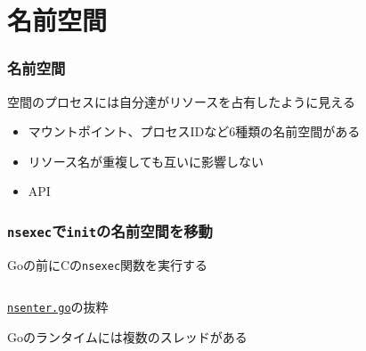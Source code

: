 \documentclass[unicode, 14pt, aspectratio=169]{beamer}
\begin{document}
\section{名前空間}
\begin{frame}[t]
  \frametitle{名前空間\supercite{namespaces}}
  空間のプロセスには自分達がリソースを占有したように見える
  \begin{itemize}[leftmargin=0.8cm,label=$\circ$]
    \item マウントポイント、プロセスIDなど6種類の名前空間がある
    \item リソース名が重複しても互いに影響しない
    \item API
    \end{itemize}
\end{frame}
\begin{frame}[t]
  \frametitle{\texttt{nsexec}で\texttt{init}の名前空間を移動}
  Goの前にCの\texttt{nsexec}関数を実行する
  \begin{center}
    \inputminted{go}{code/nsenter.go}
    \href{https://github.com/opencontainers/runc/blob/7cb363254b69e10320360b63fb73e0ffb5da7bf2/libcontainer/nsenter/nsenter.go\#L12}{\texttt{nsenter.go}}の抜粋
  \end{center}
  Goのランタイムには複数のスレッドがある
\end{frame}
\end{document}
